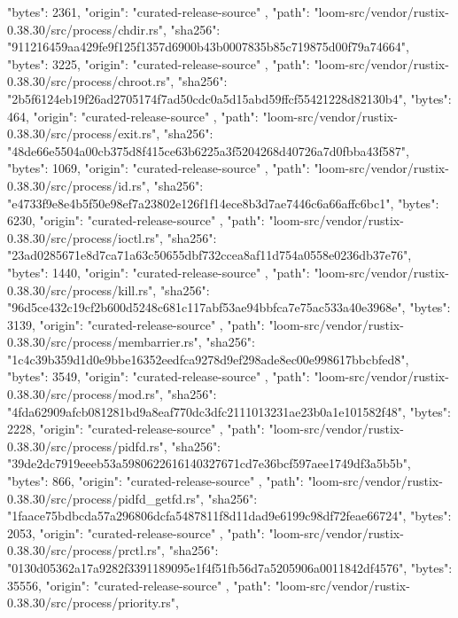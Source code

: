 {{      "bytes": 2361,
      "origin": "curated-release-source"
    },
    {
      "path": "loom-src/vendor/rustix-0.38.30/src/process/chdir.rs",
      "sha256": "911216459aa429fe9f125f1357d6900b43b0007835b85c719875d00f79a74664",
      "bytes": 3225,
      "origin": "curated-release-source"
    },
    {
      "path": "loom-src/vendor/rustix-0.38.30/src/process/chroot.rs",
      "sha256": "2b5f6124eb19f26ad2705174f7ad50cdc0a5d15abd59ffcf55421228d82130b4",
      "bytes": 464,
      "origin": "curated-release-source"
    },
    {
      "path": "loom-src/vendor/rustix-0.38.30/src/process/exit.rs",
      "sha256": "48de66e5504a00cb375d8f415ce63b6225a3f5204268d40726a7d0fbba43f587",
      "bytes": 1069,
      "origin": "curated-release-source"
    },
    {
      "path": "loom-src/vendor/rustix-0.38.30/src/process/id.rs",
      "sha256": "e4733f9e8e4b5f50e98ef7a23802e126f1f14ece8b3d7ae7446c6a66affc6bc1",
      "bytes": 6230,
      "origin": "curated-release-source"
    },
    {
      "path": "loom-src/vendor/rustix-0.38.30/src/process/ioctl.rs",
      "sha256": "23ad0285671e8d7ca71a63c50655dbf732ccea8af11d754a0558e0236db37e76",
      "bytes": 1440,
      "origin": "curated-release-source"
    },
    {
      "path": "loom-src/vendor/rustix-0.38.30/src/process/kill.rs",
      "sha256": "96d5ce432c19cf2b600d5248c681c117abf53ae94bbfca7e75ac533a40e3968e",
      "bytes": 3139,
      "origin": "curated-release-source"
    },
    {
      "path": "loom-src/vendor/rustix-0.38.30/src/process/membarrier.rs",
      "sha256": "1c4c39b359d1d0e9bbe16352eedfca9278d9ef298ade8ec00e998617bbcbfed8",
      "bytes": 3549,
      "origin": "curated-release-source"
    },
    {
      "path": "loom-src/vendor/rustix-0.38.30/src/process/mod.rs",
      "sha256": "4fda62909afcb081281bd9a8eaf770dc3dfc2111013231ae23b0a1e101582f48",
      "bytes": 2228,
      "origin": "curated-release-source"
    },
    {
      "path": "loom-src/vendor/rustix-0.38.30/src/process/pidfd.rs",
      "sha256": "39de2dc7919eeeb53a5980622616140327671cd7e36bcf597aee1749df3a5b5b",
      "bytes": 866,
      "origin": "curated-release-source"
    },
    {
      "path": "loom-src/vendor/rustix-0.38.30/src/process/pidfd_getfd.rs",
      "sha256": "1faace75bdbcda57a296806dcfa5487811f8d11dad9e6199c98df72feae66724",
      "bytes": 2053,
      "origin": "curated-release-source"
    },
    {
      "path": "loom-src/vendor/rustix-0.38.30/src/process/prctl.rs",
      "sha256": "0130d05362a17a9282f3391189095e1f4f51fb56d7a5205906a0011842df4576",
      "bytes": 35556,
      "origin": "curated-release-source"
    },
    {
      "path": "loom-src/vendor/rustix-0.38.30/src/process/priority.rs",
}}
